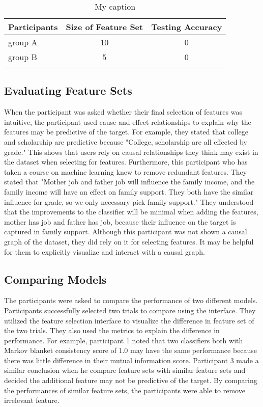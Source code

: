 \begin{table}[]
\centering
\begin{tabular}{lcc}
\hline
Participants & \multicolumn{1}{l}{Size of Feature Set} & \multicolumn{1}{l}{Testing Accuracy} \\ \hline
group A      & 10                                      & 0                                    \\
group B      & 5                                       & 0                                    \\
             &                                         &
\end{tabular}
\caption{My caption}
\label{AccuracyComparison}
\end{table}

\subsection{Evaluating Feature Sets}

When the participant was asked whether their final selection of features was intuitive, the participant used cause and effect relationships to explain why the features may be predictive of the target. For example, they stated that college and scholarship are predictive because "College, scholarship are all effected by grade." This shows that users rely on causal relationships they think may exist in the dataset when selecting for features. Furthermore, this participant who has taken a course on machine learning knew to remove redundant features. They stated that "Mother job and father job will influence the family income, and the family income will have an effect on family support.  They both have the similar influence for grade, so we only necessary pick family support." They understood that the improvements to the classifier will be minimal when adding the features, mother has job and father has job, because their influence on the target is captured in family support. Although this participant was not shown a causal graph of the dataset, they did rely on it for selecting features. It may be helpful for them to explicitly visualize and interact with a causal graph.


\subsection { Comparing Models }
The participants were asked to compare the performance of two different models. Participants successfully selected two trials to compare using the interface. They utilized the feature selection interface to visualize the difference in feature set of the two trials. They also used the metrics to explain the difference in performance. For example, participant 1 noted that two classifiers both with Markov blanket consistency score of 1.0 may have the same performance because there was little difference in their mutual information score. Participant 3 made a similar conclusion when he compare feature sets with similar feature sets and decided the additional feature may not be predictive of the target. By comparing the performances of similar feature sets, the participants were able to remove irrelevant feature.
